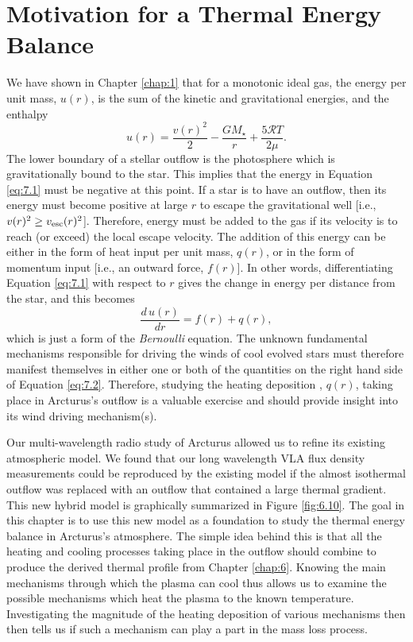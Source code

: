 \section{Motivation for a Thermal Energy Balance}\label{sec:1}
We have shown in Chapter \ref{chap:1} that for a monotonic ideal gas, the energy per unit mass, $u(r)$, is the sum of the kinetic and gravitational energies, and the enthalpy
\begin{equation}
\label{eq:7.1}
u(r)=\frac{v(r)^2}{2}-\frac{GM_{\star}}{r}+\frac{5\mathcal{R}T}{2\mu}.
\end{equation}
The lower boundary of a stellar outflow is the photosphere which is gravitationally bound to the star. This implies that the energy in Equation \ref{eq:7.1} must be negative at this point. If a star is to have an outflow, then its energy must become positive at large $r$ to escape the gravitational well [i.e., $v(r)^2 \geq v_{\rm{esc}}(r)^2$]. Therefore, energy must be added to the gas if its velocity is to reach (or exceed) the local escape velocity. The addition of this energy can be either in the form of heat input per unit mass, $q(r)$, or in the form of momentum input [i.e., an outward force, $f(r)$]. In other words, differentiating Equation \ref{eq:7.1} with respect to $r$ gives the change in energy per distance from the star, and this becomes
\begin{equation}
\label{eq:7.2}
\frac{d\,u(r)}{dr}=f(r)+q(r),
\end{equation}
which is just a form of the \textit{Bernoulli} equation. The unknown fundamental mechanisms responsible for driving the winds of cool evolved stars must therefore manifest themselves in either one or both of the quantities on the right hand side of Equation \ref{eq:7.2}. Therefore, studying the heating deposition , $q(r)$, taking place in Arcturus's outflow is a valuable exercise and should provide insight into its wind driving mechanism(s).

Our multi-wavelength radio study of Arcturus allowed us to refine its existing atmospheric model. We found that our long wavelength VLA flux density measurements could be reproduced by the existing model if the almost isothermal outflow was replaced with an outflow that contained a large thermal gradient. This new hybrid model is graphically summarized in Figure \ref{fig:6.10}. The goal in this chapter is to use this new model as a foundation to study the thermal energy balance in Arcturus's atmosphere. The simple idea behind this is that all the heating and cooling processes taking place in the outflow should combine to produce the derived thermal profile from Chapter \ref{chap:6}. Knowing the main mechanisms through which the plasma can cool thus allows us to examine the possible mechanisms which heat the plasma to the known temperature. Investigating the magnitude of the heating deposition of various mechanisms then then tells us if such a mechanism can play a part in the mass loss process.

